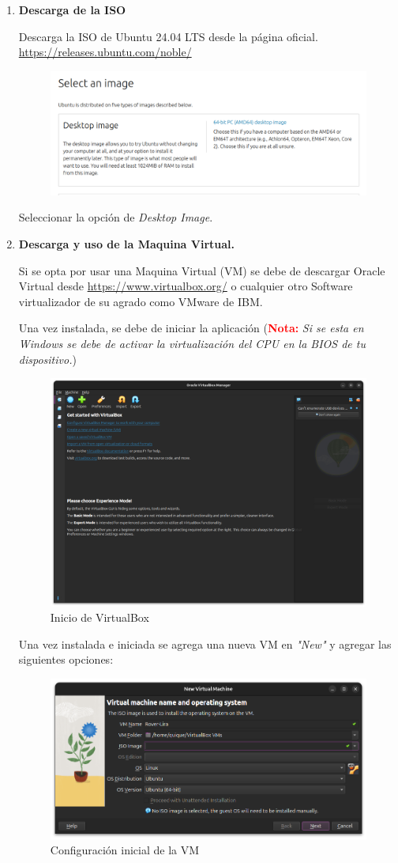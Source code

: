 \documentclass[letter,11pt]{article} %
\begin{document}
	\begin{enumerate}
		\item \textbf{Descarga de la ISO}
		
		Descarga la ISO de Ubuntu 24.04 LTS desde la página oficial. \url{https://releases.ubuntu.com/noble/}
		
		\begin{figure}[H]
			\centering
			\includegraphics[width=0.5\linewidth]{Imagenes/ISO}
			\label{fig:iso}
		\end{figure}
		
		Seleccionar la opción de \textit{Desktop Image}.
		
		\item \textbf{Descarga y uso de la Maquina Virtual.}
		
		Si se opta por usar una Maquina Virtual (VM) se debe de descargar Oracle Virtual desde \url{https://www.virtualbox.org/} o cualquier otro Software virtualizador de su agrado como VMware de IBM.
		
		Una vez instalada, se debe de iniciar la aplicación (\textbf{\textcolor{red}{Nota:}} \textit{Si se esta en Windows se debe de activar la virtualización del CPU en la BIOS de tu dispositivo.})
		
		\begin{figure}[H]
			\centering
			\includegraphics[width=0.4\linewidth]{Imagenes/Vm}
			\caption{Inicio de VirtualBox}
			\label{fig:vm}
		\end{figure}
		
		Una vez instalada e iniciada se agrega una nueva VM en \textit{"New"} y agregar las siguientes opciones:
		
		\begin{figure}[H]
			\centering
			\includegraphics[width=0.5\linewidth]{Imagenes/confiVM}
			\caption{Configuración inicial de la VM}
			\label{fig:confivm}
		\end{figure}
		

\end{enumerate}
\end{document}
